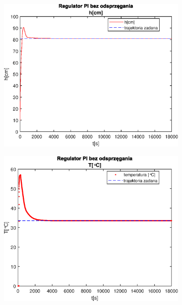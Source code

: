 \begin{figure}[h!]
   \centering
   \begin{subfigure}[b]{0.4\textwidth}
      \includegraphics[width=1\linewidth]{img/PI/noDecoupler/noDisturbance/PINoDecouplerH0.eps}
      \caption{}
      \label{fig:fig:PINodDecoupler01}
   \end{subfigure}
       
   \begin{subfigure}[b]{0.4\textwidth}
      \includegraphics[width=1\linewidth]{img/PI/noDecoupler/noDisturbance/PINoDecouplerT0.eps}
      \caption{}
      \label{fig:fig:PINodDecoupler02}
   \end{subfigure}
       

\end{figure}

